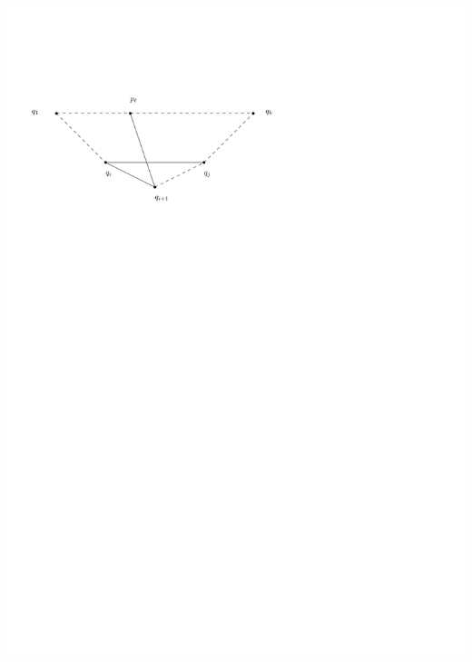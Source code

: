 \documentclass[a4paper]{article}
\begin{document}
\includegraphics[scale=1]{unifiedAlgo/img/rightNeighbourwalk/neighbourWalkChords}
\clearpage%
\end{document}

